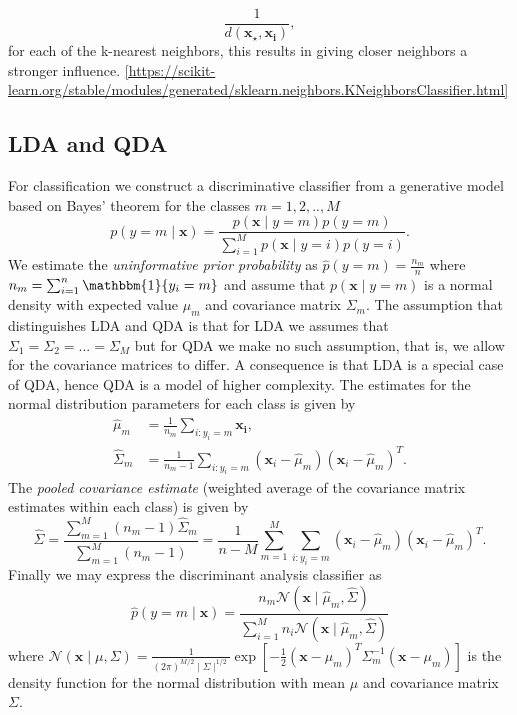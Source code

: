 \documentclass{article}
\begin{document}
\begin{equation}
    \dfrac{1}{d(\boldsymbol{x_{\star}, \boldsymbol{x_i}})}, 
\end{equation}
for each of the k-nearest neighbors, this results in giving closer neighbors a stronger influence.
\ref{https://scikit-learn.org/stable/modules/generated/sklearn.neighbors.KNeighborsClassifier.html}

\subsection{LDA and QDA}
For classification we construct a discriminative classifier from a generative model based on Bayes' theorem for the classes $m=1,2,..,M$
\begin{equation}
    p(y=m \mid \boldsymbol{x}) = \frac{ p(\boldsymbol{x} \mid y=m) p(y=m)}
    {\sum_{i=1}^{M} p(\boldsymbol{x} \mid y=i)p(y=i)}.
\end{equation}
We estimate the \textit{uninformative prior probability} as $\hat{p}(y=m) = \frac{n_m}{n}$ where $n_m = \sum_{i=1}^{n} \mathbbm{1}\{y_i=m\}$ and assume that $p(\boldsymbol{x} \mid y=m)$ is a normal density with expected value $\mu_m$ and covariance matrix $\Sigma_m$. The assumption that distinguishes LDA and QDA is that for LDA we assumes that $\Sigma_1=\Sigma_2=...=\Sigma_M$ but for QDA we make no such assumption, that is, we allow for the covariance matrices to differ. A consequence is that LDA is a special case of QDA, hence QDA is a model of higher complexity. The estimates for the normal distribution parameters for each class is given by
\begin{align}
    \hat{\mu}_m &= \frac{1}{n_m} \sum_{i:y_i=m} \boldsymbol{x_i}, \\
    \hat{\Sigma}_m &= \frac{1}{n_m-1}\sum_{i:y_i=m} (\boldsymbol{x}_i-\hat{\mu}_m)(\boldsymbol{x}_i-\hat{\mu}_m)^T.
\end{align}
The \textit{pooled covariance estimate} (weighted average of the covariance matrix estimates within each class) is given by
\begin{equation}
    \hat{\Sigma} = \frac{\sum_{m=1}^{M} (n_m-1)\hat{\Sigma}_m}{\sum_{m=1}^{M} (n_m-1)}=\frac{1}{n-M}\sum_{m=1}^{M}\sum_{i:y_i=m} (\boldsymbol{x}_i-\hat{\mu}_m)(\boldsymbol{x}_i-\hat{\mu}_m)^T.
\end{equation}
Finally we may express the discriminant analysis classifier as
\begin{equation}
    \hat{p}(y=m \mid \boldsymbol{x}) = \frac{n_m\mathcal{N}(\boldsymbol{x} \mid \hat{\mu}_m, \hat{\Sigma})}{\sum_{i=1}^{M} n_i\mathcal{N}(\boldsymbol{x} \mid \hat{\mu}_m, \hat{\Sigma})}
\end{equation}
where $\mathcal{N}(\boldsymbol{x} \mid \mu,\Sigma)=\frac{1}{(2\pi)^{M/2}\mid\Sigma\mid^{1/2}}\exp{[-\frac{1}{2}(\boldsymbol{x}-\mu_m)^T\Sigma_m^{-1}(\boldsymbol{x}-\mu_m)]}$ is the density function for the normal distribution with mean $\mu$ and covariance matrix $\Sigma$.
\end{document}
